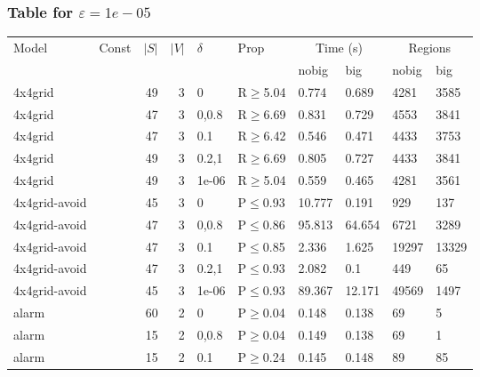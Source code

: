 \subsubsection{Table for \(\varepsilon=1e-05\)}
\begin{longtable}{llrrllllll}

        \toprule
        Model & Const & $|S|$ & $|V|$ & $\delta$ & Prop & \multicolumn{2}{c}{Time (s)} & \multicolumn{2}{c}{Regions} \\
        \cmidrule(ll){7-8} \cmidrule(ll){9-10}
        & & & & & & nobig & big & nobig & big \\
        \midrule
        
 4x4grid       &          &     	49 &   3 & 0     & R$\geq$5.04  & 0.774    & 0.689    & 4281    & 3585   \\
 4x4grid       &          &     	47 &   3 & 0,0.8 & R$\geq$6.69  & 0.831    & 0.729    & 4553    & 3841   \\
 4x4grid       &          &     	47 &   3 & 0.1   & R$\geq$6.42  & 0.546    & 0.471    & 4433    & 3753   \\
 4x4grid       &          &     	49 &   3 & 0.2,1 & R$\geq$6.69  & 0.805    & 0.727    & 4433    & 3841   \\
 4x4grid       &          &     	49 &   3 & 1e-06 & R$\geq$5.04  & 0.559    & 0.465    & 4281    & 3561   \\
 4x4grid-avoid &          &     	45 &   3 & 0     & P$\leq$0.93  & 10.777   & 0.191    & 929     & 137    \\
 4x4grid-avoid &          &     	47 &   3 & 0,0.8 & P$\leq$0.86  & 95.813   & 64.654   & 6721    & 3289   \\
 4x4grid-avoid &          &     	47 &   3 & 0.1   & P$\leq$0.85  & 2.336    & 1.625    & 19297   & 13329  \\
 4x4grid-avoid &          &     	47 &   3 & 0.2,1 & P$\leq$0.93  & 2.082    & 0.1      & 449     & 65     \\
 4x4grid-avoid &          &     	45 &   3 & 1e-06 & P$\leq$0.93  & 89.367   & 12.171   & 49569   & 1497   \\
 alarm         &          &     	60 &   2 & 0     & P$\geq$0.04  & 0.148    & 0.138    & 69      & 5      \\
 alarm         &          &     	15 &   2 & 0,0.8 & P$\geq$0.04  & 0.149    & 0.138    & 69      & 1      \\
 alarm         &          &     	15 &   2 & 0.1   & P$\geq$0.24  & 0.145    & 0.148    & 89      & 85     \\

\end{longtable}
